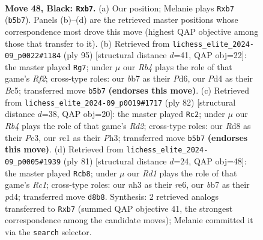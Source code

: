 \documentclass[11pt]{article}
\begin{document}
\clearpage

\begin{figure}[p]\centering
\begin{subfigure}{0.46\textwidth}\centering
\resizebox{\linewidth}{!}{%
\newchessgame
\chessboard[
  setfen={3r1k2/1B3p1p/8/pr6/3p2P1/1P5N/1R1K3P/2R5 b - - 0 48},
  showmover=false,
  pgfstyle=straightmove, color=movearrow, markmove={b5-b7}
]}
\caption{}
\end{subfigure}\hfill
\begin{subfigure}{0.46\textwidth}\centering
\resizebox{\linewidth}{!}{%
\newchessgame
\chessboard[
  setfen={8/5r1k/3p3p/2bP4/5PP1/2r5/4R1KP/5R2 b - - 0 48},
  showmover=false,
  pgfstyle=straightmove, color=movearrow, markmove={f7-g7}
]}
\caption{}
\end{subfigure}
\\[4pt]
\begin{subfigure}{0.46\textwidth}\centering
\resizebox{\linewidth}{!}{%
\newchessgame
\chessboard[
  setfen={r5k1/6p1/7p/8/2p5/r1P4P/p2R1PP1/R4K2 w - - 6 42},
  showmover=false,
  pgfstyle=straightmove, color=movearrow, markmove={d2-c2}
]}
\caption{}
\end{subfigure}\hfill
\begin{subfigure}{0.46\textwidth}\centering
\resizebox{\linewidth}{!}{%
\newchessgame
\chessboard[
  setfen={2r3k1/6p1/4R3/6p1/pr1P4/8/1P4PP/1K1R4 b - - 0 41},
  showmover=false,
  pgfstyle=straightmove, color=movearrow, markmove={c8-b8}
]}
\caption{}
\end{subfigure}
\caption{\textbf{Move 48, Black: \texttt{Rxb7}.} (a) Our position; Melanie plays \texttt{Rxb7} (\texttt{b5b7}). Panels (b)--(d) are the retrieved master positions whose correspondence most drove this move (highest QAP objective among those that transfer to it). (b) Retrieved from \texttt{lichess\_elite\_2024-09\_p0022\#1184} (ply 95) [structural distance $d$=41, QAP obj=22]: the master played \texttt{Rg7}; under $\mu$ our \emph{Rb4} plays the role of that game's \emph{Rf2}; cross-type roles: our \emph{b}b7 as their \emph{P}d6, our \emph{P}d4 as their \emph{B}c5; transferred move \texttt{b5b7} \textbf{(endorses this move)}. (c) Retrieved from \texttt{lichess\_elite\_2024-09\_p0019\#1717} (ply 82) [structural distance $d$=38, QAP obj=20]: the master played \texttt{Rc2}; under $\mu$ our \emph{Rb4} plays the role of that game's \emph{Rd2}; cross-type roles: our \emph{R}d8 as their \emph{P}c3, our \emph{r}c1 as their \emph{P}h3; transferred move \texttt{b5b7} \textbf{(endorses this move)}. (d) Retrieved from \texttt{lichess\_elite\_2024-09\_p0005\#1939} (ply 81) [structural distance $d$=24, QAP obj=48]: the master played \texttt{Rcb8}; under $\mu$ our \emph{Rd1} plays the role of that game's \emph{Rc1}; cross-type roles: our \emph{n}h3 as their \emph{r}e6, our \emph{b}b7 as their \emph{p}d4; transferred move \texttt{d8b8}. Synthesis: 2 retrieved analogs transferred to \texttt{Rxb7} (summed QAP objective 41, the strongest correspondence among the candidate moves); Melanie committed it via the \texttt{search} selector.}
\label{fig:thought-m95}
\end{figure}
\end{document}

